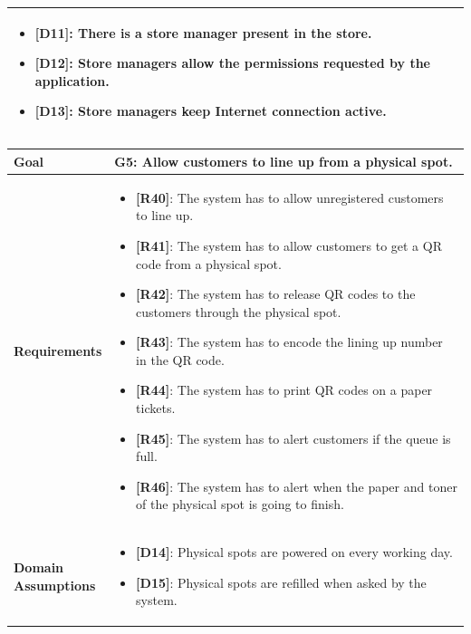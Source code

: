 \begin{table}[H]
\begin{tabular}{| m{} | m{} |}
		\begin{itemize}
			\item {\textbf{[D11]}}: There is a store manager present in the store.
			\item {\textbf{[D12]}}: Store managers allow the permissions requested by the application.
			\item {\textbf{[D13]}}: Store managers keep Internet connection active.
		\end{itemize} \\ 
	\hline
\end{tabular}
\end{table}

\begin{table}[H]
\centering
\begin{tabular}{| m{} | m{} |} 
	\hline
	\textbf{Goal} &
		\textbf{G5: Allow customers to line up from a physical spot.} \\
	\hline
	\textbf{Requirements} &
		\begin{itemize}
			\item {\textbf{[R40]}}: The system has to allow unregistered customers to line up.
			\item {\textbf{[R41]}}: The system has to allow customers to get a QR code from a physical spot.
			\item {\textbf{[R42]}}: The system has to release QR codes to the customers through the physical spot.
			\item {\textbf{[R43]}}: The system has to encode the lining up number in the QR code.
			\item {\textbf{[R44]}}: The system has to print QR codes on a paper tickets.
			\item {\textbf{[R45]}}: The system has to alert customers if the queue is full.
			\item {\textbf{[R46]}}: The system has to alert when the paper and toner of the physical spot is going to finish.
		\end{itemize} \\ 
	\hline
	\shortstack[l]{\textbf{Domain} \\ \textbf{Assumptions}} & 
		\begin{itemize}
			\item {\textbf{[D14]}}: Physical spots are powered on every working day.
			\item {\textbf{[D15]}}: Physical spots are refilled when asked by the system. 
		\end{itemize} \\ 
	\hline
\end{tabular}
\end{table}

